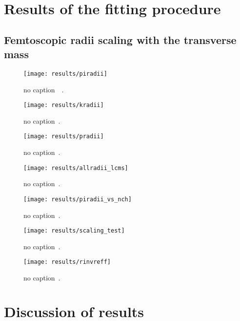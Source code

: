   \section{Results of the fitting procedure}
    \subsection{Femtoscopic radii scaling with the transverse mass}
      \begin{figure}[h]
        \centering
        \centerline{\texttt{[image: results/piradii]}}
        \caption{no caption~\cite{alice_pion}~\cite{galazyn}.}
      \label{fig:piradii}
      \end{figure}



      \begin{figure}[h]
        \centering
        \centerline{\texttt{[image: results/kradii]}}
        \caption{no caption~\cite{galazyn}.}
      \label{fig:kradii}
      \end{figure}



      \begin{figure}[h]
        \centering
        \centerline{\texttt{[image: results/pradii]}}
        \caption{no caption~\cite{galazyn}.}
      \label{fig:pradii}
      \end{figure}    

      \begin{figure}[h]
        \centering
        \centerline{\texttt{[image: results/allradii\_lcms]}}
        \caption{no caption~\cite{galazyn}.}
      \label{fig:allradii}
      \end{figure}    

      \begin{figure}[h]
        \centering
        \centerline{\texttt{[image: results/piradii\_vs\_nch]}}
        \caption{no caption~\cite{galazyn}.}
      \label{fig:piradii}
      \end{figure}    

      \begin{figure}[h]
        \centering
        \centerline{\texttt{[image: results/scaling\_test]}}
        \caption{no caption~\cite{galazyn}.}
      \label{fig:piradii}
      \end{figure}    

      \begin{figure}[h]
        \centering
        \centerline{\texttt{[image: results/rinvreff]}}
        \caption{no caption~\cite{galazyn}.}
      \label{fig:piradii}
      \end{figure}

    \FloatBarrier
  \section{Discussion of results}
